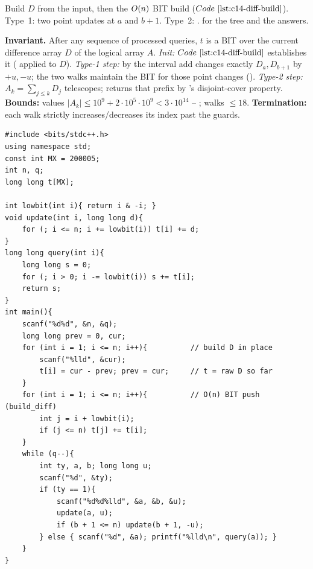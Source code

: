 Build \(D\) from the input, then the \(O(n)\) BIT build
(\(\coderef{c14-diff-build}\)).  Type~1: two point updates at \(a\) and
\(b{+}1\).  Type~2: .   for the tree and the
answers.

\begin{proofbox}
\textbf{Invariant.} After any sequence of processed queries, \(t\) is a BIT
over the current difference array \(D\) of the logical array \(A\).
\emph{Init:} \(\coderef{c14-diff-build}\) establishes it (
applied to \(D\)).  \emph{Type-1 step:} by  the interval add
changes exactly \(D_a,D_{b+1}\) by \(+u,-u\); the two  walks
maintain the BIT for those point changes ().
\emph{Type-2 step:} \(A_k=\sum_{j\le k}D_j\) telescopes; 
returns that prefix by 's disjoint-cover property.
\textbf{Bounds:} values \(|A_k|\le 10^9+2\cdot10^5\cdot10^9<3\cdot10^{14}\)
-- ; walks \(\le18\). \textbf{Termination:} each walk
strictly increases/decreases its index past the guards.
\end{proofbox}

\begin{lstlisting}[caption={CSES 1651 full solution (difference BIT)}, label={lst:c14-1651-soln}]
#include <bits/stdc++.h>
using namespace std;
const int MX = 200005;
int n, q;
long long t[MX];

int lowbit(int i){ return i & -i; }
void update(int i, long long d){
    for (; i <= n; i += lowbit(i)) t[i] += d;
}
long long query(int i){
    long long s = 0;
    for (; i > 0; i -= lowbit(i)) s += t[i];
    return s;
}
int main(){
    scanf("%d%d", &n, &q);
    long long prev = 0, cur;
    for (int i = 1; i <= n; i++){          // build D in place
        scanf("%lld", &cur);
        t[i] = cur - prev; prev = cur;     // t = raw D so far
    }
    for (int i = 1; i <= n; i++){          // O(n) BIT push (build_diff)
        int j = i + lowbit(i);
        if (j <= n) t[j] += t[i];
    }
    while (q--){
        int ty, a, b; long long u;
        scanf("%d", &ty);
        if (ty == 1){
            scanf("%d%d%lld", &a, &b, &u);
            update(a, u);
            if (b + 1 <= n) update(b + 1, -u);
        } else { scanf("%d", &a); printf("%lld\n", query(a)); }
    }
}
\end{lstlisting}

